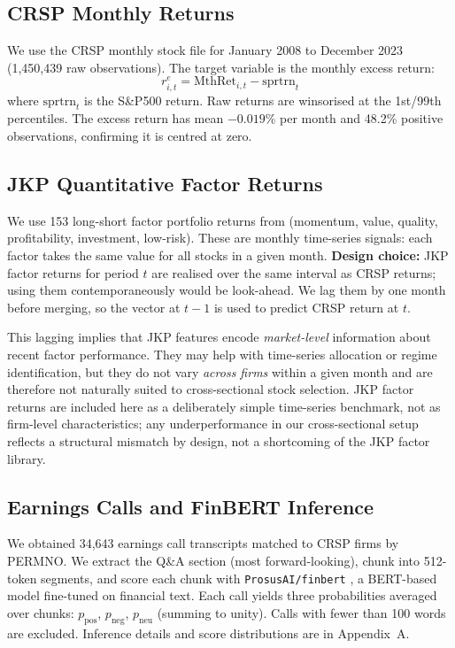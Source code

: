 \subsection{CRSP Monthly Returns}

We use the CRSP monthly stock file for January 2008 to December 2023 (1,450,439 raw observations). The target variable is the monthly excess return:
\[
    r^e_{i,t} = \text{MthRet}_{i,t} - \text{sprtrn}_t
\]
where $\text{sprtrn}_t$ is the S\&P500 return. Raw returns are winsorised at the 1st/99th percentiles. The excess return has mean $-0.019\%$ per month and 48.2\% positive observations, confirming it is centred at zero.

\subsection{JKP Quantitative Factor Returns}

We use 153 long-short factor portfolio returns from \cite{jkp2023} (momentum, value, quality, profitability, investment, low-risk). These are monthly time-series signals: each factor takes the same value for all stocks in a given month. \textbf{Design choice:} JKP factor returns for period $t$ are realised over the same interval as CRSP returns; using them contemporaneously would be look-ahead. We lag them by one month before merging, so the vector at $t-1$ is used to predict CRSP return at $t$.

This lagging implies that JKP features encode \textit{market-level} information about recent factor performance. They may help with time-series allocation or regime identification, but they do not vary \textit{across firms} within a given month and are therefore not naturally suited to cross-sectional stock selection. JKP factor returns are included here as a deliberately simple time-series benchmark, not as firm-level characteristics; any underperformance in our cross-sectional setup reflects a structural mismatch by design, not a shortcoming of the JKP factor library.

\subsection{Earnings Calls and FinBERT Inference}

We obtained 34,643 earnings call transcripts matched to CRSP firms by PERMNO. We extract the Q\&A section (most forward-looking), chunk into 512-token segments, and score each chunk with \texttt{ProsusAI/finbert} \cite{araci2019}, a BERT-based model fine-tuned on financial text. Each call yields three probabilities averaged over chunks: $p_\text{pos}$, $p_\text{neg}$, $p_\text{neu}$ (summing to unity). Calls with fewer than 100 words are excluded. Inference details and score distributions are in Appendix~A.

